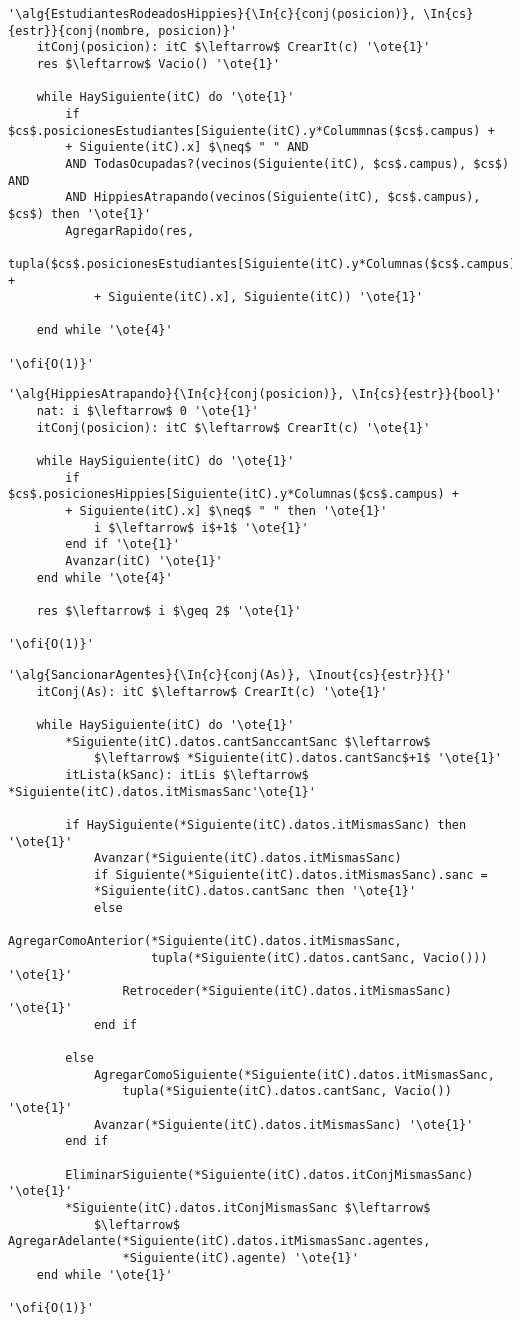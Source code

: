 \begin{lstlisting}[mathescape]
'\alg{EstudiantesRodeadosHippies}{\In{c}{conj(posicion)}, \In{cs}{estr}}{conj(nombre, posicion)}'
	itConj(posicion): itC $\leftarrow$ CrearIt(c) '\ote{1}'
	res $\leftarrow$ Vacio() '\ote{1}'

	while HaySiguiente(itC) do '\ote{1}'
		if $cs$.posicionesEstudiantes[Siguiente(itC).y*Colummnas($cs$.campus) +
		+ Siguiente(itC).x] $\neq$ " " AND
		AND TodasOcupadas?(vecinos(Siguiente(itC), $cs$.campus), $cs$) AND
		AND HippiesAtrapando(vecinos(Siguiente(itC), $cs$.campus), $cs$) then '\ote{1}'
		AgregarRapido(res,
			tupla($cs$.posicionesEstudiantes[Siguiente(itC).y*Columnas($cs$.campus) +
			+ Siguiente(itC).x], Siguiente(itC)) '\ote{1}'

	end while '\ote{4}'

'\ofi{O(1)}'
\end{lstlisting}

\begin{lstlisting}[mathescape]
'\alg{HippiesAtrapando}{\In{c}{conj(posicion)}, \In{cs}{estr}}{bool}'
	nat: i $\leftarrow$ 0 '\ote{1}'
	itConj(posicion): itC $\leftarrow$ CrearIt(c) '\ote{1}'
	
	while HaySiguiente(itC) do '\ote{1}'
		if $cs$.posicionesHippies[Siguiente(itC).y*Columnas($cs$.campus) +
		+ Siguiente(itC).x] $\neq$ " " then '\ote{1}'
			i $\leftarrow$ i$+1$ '\ote{1}'
		end if '\ote{1}'
		Avanzar(itC) '\ote{1}'
	end while '\ote{4}'
	
	res $\leftarrow$ i $\geq 2$ '\ote{1}'

'\ofi{O(1)}'
\end{lstlisting}

\begin{lstlisting}[mathescape]
'\alg{SancionarAgentes}{\In{c}{conj(As)}, \Inout{cs}{estr}}{}'
	itConj(As): itC $\leftarrow$ CrearIt(c) '\ote{1}'

	while HaySiguiente(itC) do '\ote{1}'
		*Siguiente(itC).datos.cantSanccantSanc $\leftarrow$
			$\leftarrow$ *Siguiente(itC).datos.cantSanc$+1$ '\ote{1}'
		itLista(kSanc): itLis $\leftarrow$ *Siguiente(itC).datos.itMismasSanc'\ote{1}'

		if HaySiguiente(*Siguiente(itC).datos.itMismasSanc) then '\ote{1}'
			Avanzar(*Siguiente(itC).datos.itMismasSanc)
			if Siguiente(*Siguiente(itC).datos.itMismasSanc).sanc = 
			*Siguiente(itC).datos.cantSanc then '\ote{1}'
			else
				AgregarComoAnterior(*Siguiente(itC).datos.itMismasSanc,
					tupla(*Siguiente(itC).datos.cantSanc, Vacio())) '\ote{1}'
				Retroceder(*Siguiente(itC).datos.itMismasSanc) '\ote{1}'
			end if

		else
			AgregarComoSiguiente(*Siguiente(itC).datos.itMismasSanc,
				tupla(*Siguiente(itC).datos.cantSanc, Vacio()) '\ote{1}'
			Avanzar(*Siguiente(itC).datos.itMismasSanc) '\ote{1}'
		end if
		
		EliminarSiguiente(*Siguiente(itC).datos.itConjMismasSanc) '\ote{1}'
		*Siguiente(itC).datos.itConjMismasSanc $\leftarrow$
			$\leftarrow$ AgregarAdelante(*Siguiente(itC).datos.itMismasSanc.agentes, 
				*Siguiente(itC).agente) '\ote{1}'
	end while '\ote{1}'

'\ofi{O(1)}'
\end{lstlisting}

